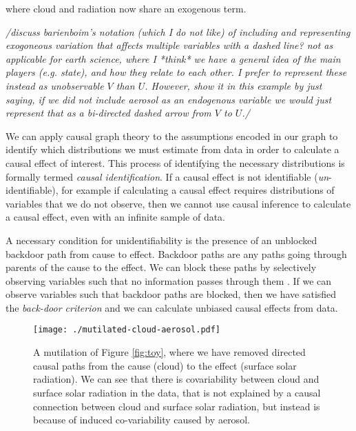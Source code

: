 \documentclass[12pt]{article}
\begin{document}
where cloud and radiation now share an exogenous term.

\textit{/discuss barienboim's notation (which I do not like) of
  including and representing exogoneous variation that affects
  multiple variables with a dashed line? not as applicable for earth
  science, where I *think* we have a general idea of the main players
  (e.g. state), and how they relate to each other. I prefer to
  represent these instead as unobservable $V$ than $U$. However, show
  it in this example by just saying, if we did not include aerosol as
  an endogenous variable  we would just represent that as a
  bi-directed dashed arrow from $V$ to $U$./}

We can apply causal graph theory
\citep[e.g.,][]{pearl1995causal,shpitser2006} to the assumptions
encoded in our graph to identify which distributions we must estimate
from data in order to calculate a causal effect of interest. This
process of identifying the necessary distributions is formally termed
\emph{causal identification}. If a causal effect is not identifiable
(\emph{un}-identifiable), for example if calculating a causal effect
requires distributions of variables that we do not observe, then we
cannot use causal inference to calculate a causal effect, even with an
infinite sample of data.


A necessary condition for unidentifiability is the presence of an
unblocked backdoor path from cause to effect. Backdoor paths are any
paths going through parents of the cause to the effect. We can block
these paths by selectively observing variables such that no
information passes through them \citep{geiger-d-sep}. If we can
observe variables such that backdoor paths are blocked, then we have
satisfied the \emph{back-door criterion} \citep{pearl2009} and we can
calculate unbiased causal effects from data.

\begin{figure}
  \noindent\texttt{[image: ./mutilated-cloud-aerosol.pdf]}\\
  \caption{A mutilation of Figure \ref{fig:toy}, where we have removed
    directed causal paths from the cause (cloud) to the effect (surface
    solar radiation). We can see that there is covariability between
    cloud and surface solar radiation in the data, that is not
    explained by a causal connection between cloud and surface solar
    radiation, but instead is because of induced co-variability caused
    by aerosol.}
  \label{fig:mutilated-toy}
\end{figure}
\end{document}
